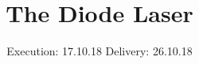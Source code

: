 

\subject{V 60}
\title{The Diode Laser}
\date{
  Execution: 17.10.18
  \hspace{3em}
  Delivery: 26.10.18
}



\maketitle
\thispagestyle{empty}
\tableofcontents
\newpage






\printbibliography




